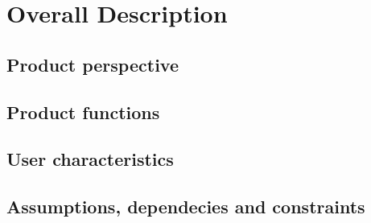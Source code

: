 \chapter{Overall Description}

\section{Product perspective}

\section{Product functions}

\section{User characteristics}

\section{Assumptions, dependecies and constraints}

